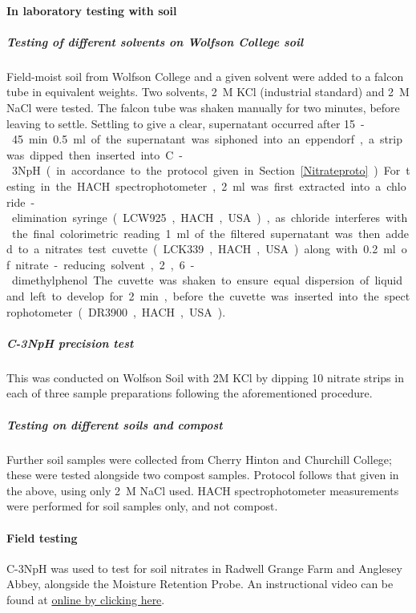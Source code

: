 \paragraph{In laboratory testing with soil}

\subparagraph{Testing of different solvents on Wolfson College soil} 
\noindent Field-moist soil from Wolfson College and a given solvent were added to a falcon tube in equivalent weights. Two solvents, \SI{2}{M} KCl (industrial standard) and \SI{2}{M} NaCl were tested. The falcon tube was shaken manually for two minutes, before leaving to settle. Settling to give a clear, %
supernatant occurred after \SI{15}-\SI{45}{\minute}. \SI{0.5}{\ml} of the supernatant was siphoned into an eppendorf,%
a strip was dipped then inserted into C-3NpH (in accordance to the protocol given in Section \ref{Nitrateproto}). For testing in the HACH spectrophotometer, \SI{2}{\ml} was first extracted into a chloride-elimination syringe (LCW925, HACH, USA), as chloride interferes with the final colorimetric reading. \SI{1}{\ml} of the filtered supernatant was then added to a nitrates test cuvette (LCK339, HACH, USA) along with \SI{0.2}{\ml} of nitrate-reducing solvent, 2,6-dimethylphenol. The cuvette was shaken to ensure equal dispersion of liquid and left to develop for \SI{2}{\minute}, before the cuvette was inserted into the spectrophotometer (DR3900, HACH, USA). 


\subparagraph{C-3NpH precision test}
\noindent This was conducted on Wolfson Soil with 2M KCl by dipping 10 nitrate strips in each of three sample preparations following the aforementioned procedure.

\subparagraph{Testing on different soils and compost}

\noindent Further soil samples were collected from Cherry Hinton and Churchill College; these were tested alongside two compost samples. Protocol follows that given in the above, using only \SI{2}{M} NaCl used.  HACH spectrophotometer measurements were performed for soil samples only, and not compost. 

\paragraph{Field testing}
C-3NpH was used to test for soil nitrates in Radwell Grange Farm and Anglesey Abbey, alongside the Moisture Retention Probe. An instructional video can be found at \href{https://universityofcambridgecloud-my.sharepoint.com/:v:/g/personal/eb729_cam_ac_uk/EUzpSPU2YTRGkFbAFTVqIYkBwqILsmehg1pN4DrM1jGbfg?e=8rYsFH}{online by clicking here}.


